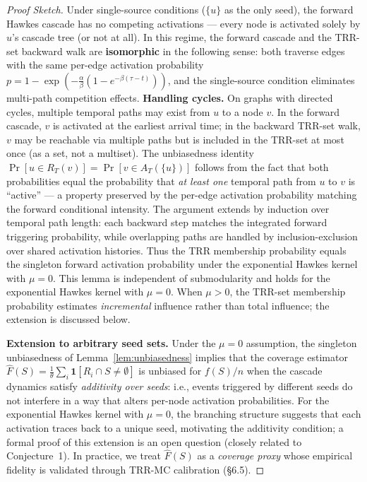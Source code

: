 \documentclass[10pt,conference]{IEEEtran}
\begin{document}
\begin{proof}[Proof Sketch]
Under single-source conditions ($\{u\}$ as the only seed), the forward Hawkes cascade has no competing activations — every node is activated solely by $u$'s cascade tree (or not at all).
In this regime, the forward cascade and the TRR-set backward walk are \textbf{isomorphic} in the following sense: both traverse edges with the same per-edge activation probability $p = 1-\exp(-\frac{\alpha}{\beta}(1-e^{-\beta(\tau-t)}))$, and the single-source condition eliminates multi-path competition effects.
\textbf{Handling cycles.} On graphs with directed cycles, multiple temporal paths may exist from $u$ to a node $v$.
In the forward cascade, $v$ is activated at the earliest arrival time; in the backward TRR-set walk, $v$ may be reachable via multiple paths but is included in the TRR-set at most once (as a set, not a multiset).
The unbiasedness identity $\Pr[u \in R_T(v)] = \Pr[v \in A_T(\{u\})]$ follows from the fact that both probabilities equal the probability that \emph{at least one} temporal path from $u$ to $v$ is ``active'' — a property preserved by the per-edge activation probability matching the forward conditional intensity.
The argument extends by induction over temporal path length: each backward step matches the integrated forward triggering probability, while overlapping paths are handled by inclusion-exclusion over shared activation histories.
Thus the TRR membership probability equals the singleton forward activation probability under the exponential Hawkes kernel with $\mu=0$.
This lemma is independent of submodularity and holds for the exponential Hawkes kernel with $\mu=0$. When $\mu>0$, the TRR-set membership probability estimates \emph{incremental} influence rather than total influence; the extension is discussed below.

\textbf{Extension to arbitrary seed sets.}
Under the $\mu=0$ assumption, the singleton unbiasedness of Lemma~\ref{lem:unbiasedness} implies that the coverage estimator $\hat{F}(S) = \frac{1}{\theta}\sum_i \mathbf{1}[R_i \cap S \neq \emptyset]$ is unbiased for $f(S)/n$ when the cascade dynamics satisfy \emph{additivity over seeds}: i.e., events triggered by different seeds do not interfere in a way that alters per-node activation probabilities.
For the exponential Hawkes kernel with $\mu=0$, the branching structure suggests that each activation traces back to a unique seed, motivating the additivity condition; a formal proof of this extension is an open question (closely related to Conjecture~1).
In practice, we treat $\hat{F}(S)$ as a \emph{coverage proxy} whose empirical fidelity is validated through TRR-MC calibration (\S6.5).
\end{proof}
\end{document}
